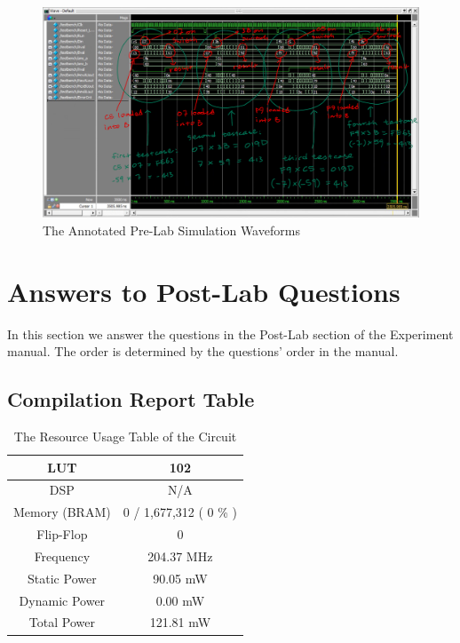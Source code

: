 \documentclass{article}
\begin{document}
\begin{figure}[h]
    \centering
    \includegraphics[width=\textwidth]{annotated.png}
    \caption{The Annotated Pre-Lab Simulation Waveforms}
\end{figure}

\clearpage


\section{Answers to Post-Lab Questions}
In this section we answer the questions in the Post-Lab section of the Experiment manual. The order is determined by the questions' order in the manual.

\subsection{Compilation Report Table}
\begin{table}[h]
    \centering
    \begin{tabular}{|c|c|}
    \hline
    LUT           & 102                    \\ \hline
    DSP           & N/A                    \\ \hline
    Memory (BRAM) & 0 / 1,677,312 ( 0 \% ) \\ \hline
    Flip-Flop     & 0                      \\ \hline
    Frequency     & 204.37 MHz             \\ \hline
    Static Power  & 90.05 mW               \\ \hline
    Dynamic Power & 0.00 mW                \\ \hline
    Total Power   & 121.81 mW              \\ \hline
    \end{tabular}
    \caption{The Resource Usage Table of the Circuit}
    \label{tab:resource_usage}
\end{table}
\end{document}

